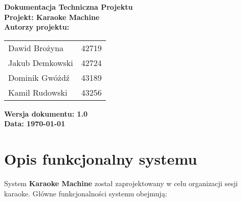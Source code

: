 \documentclass[a4paper,12pt]{article}
\begin{document}
\thispagestyle{empty}
\begin{titlepage}
    \centering
    {\Large\textbf{Dokumentacja Techniczna Projektu}}\\[1em]
    {\large \textbf{Projekt: Karaoke Machine}} \\

    \textbf{Autorzy projektu:}

    \vspace{1em}

    \begin{tabular}{@{}l r@{}}
    Dawid Brożyna & 42719 \\
    Jakub Demkowski & 42724\\
    Dominik Gwóżdź & 43189 \\
    Kamil Rudowski & 43256 \\
    \end{tabular}

    \vfill

    {\large \textbf{Wersja dokumentu: 1.0}}\\[0.5em]
    {\large \textbf{Data: \today}}
\end{titlepage}

\tableofcontents
\newpage

\section{Opis funkcjonalny systemu}
System \textbf{Karaoke Machine} został zaprojektowany w celu organizacji sesji karaoke. Główne funkcjonalności systemu obejmują:
\end{document}
